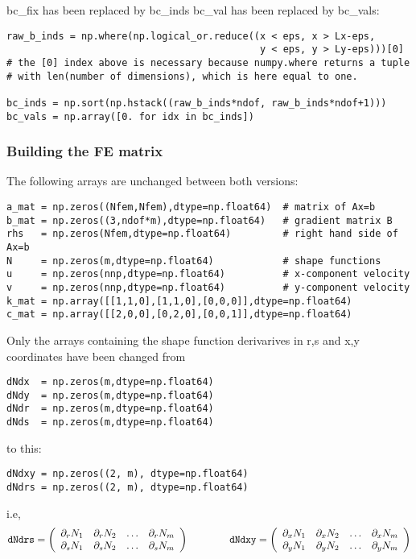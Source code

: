 bc\_fix has been replaced by bc\_inds
bc\_val has been replaced by bc\_vals:

\begin{lstlisting}
raw_b_inds = np.where(np.logical_or.reduce((x < eps, x > Lx-eps,
                                            y < eps, y > Ly-eps)))[0]
# the [0] index above is necessary because numpy.where returns a tuple
# with len(number of dimensions), which is here equal to one.

bc_inds = np.sort(np.hstack((raw_b_inds*ndof, raw_b_inds*ndof+1)))
bc_vals = np.array([0. for idx in bc_inds])
\end{lstlisting}

\subsubsection*{Building the FE matrix}

The following arrays are unchanged between both versions:

\begin{lstlisting}
a_mat = np.zeros((Nfem,Nfem),dtype=np.float64)  # matrix of Ax=b
b_mat = np.zeros((3,ndof*m),dtype=np.float64)   # gradient matrix B 
rhs   = np.zeros(Nfem,dtype=np.float64)         # right hand side of Ax=b
N     = np.zeros(m,dtype=np.float64)            # shape functions
u     = np.zeros(nnp,dtype=np.float64)          # x-component velocity
v     = np.zeros(nnp,dtype=np.float64)          # y-component velocity
k_mat = np.array([[1,1,0],[1,1,0],[0,0,0]],dtype=np.float64) 
c_mat = np.array([[2,0,0],[0,2,0],[0,0,1]],dtype=np.float64) 
\end{lstlisting}

Only the arrays containing the shape function derivarives in r,s and x,y
coordinates have been changed from 

\begin{lstlisting}
dNdx  = np.zeros(m,dtype=np.float64)   
dNdy  = np.zeros(m,dtype=np.float64)    
dNdr  = np.zeros(m,dtype=np.float64)     
dNds  = np.zeros(m,dtype=np.float64)       
\end{lstlisting}
 
to this:

\begin{lstlisting}
dNdxy = np.zeros((2, m), dtype=np.float64)  
dNdrs = np.zeros((2, m), dtype=np.float64)  
\end{lstlisting}

i.e,
\[
{\tt dNdrs} = 
\left(
\begin{array}{cccc}
\partial_r N_1 & \partial_r N_2 & \dots & \partial_r N_m \\ 
\partial_s N_1 & \partial_s N_2 & \dots & \partial_s N_m 
\end{array}
\right)
\qquad
\qquad
{\tt dNdxy} = 
\left(
\begin{array}{cccc}
\partial_x N_1 & \partial_x N_2 & \dots & \partial_x N_m \\ 
\partial_y N_1 & \partial_y N_2 & \dots & \partial_y N_m 
\end{array}
\right)
\]

